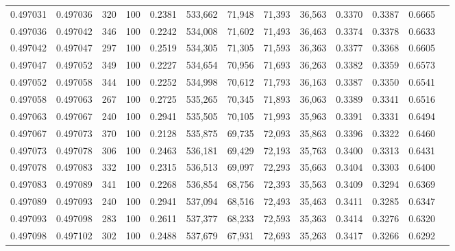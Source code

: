 \begin{tabular}{rrrrrrrrrrrrr}
0.497031 & 0.497036 &   320 & 100 &                                     0.2381 & 533,662 &  71,948 &  71,393 &  36,563 & 0.3370 & 0.3387 & 0.6665 \\
0.497036 & 0.497042 &   346 & 100 &                                     0.2242 & 534,008 &  71,602 &  71,493 &  36,463 & 0.3374 & 0.3378 & 0.6633 \\
0.497042 & 0.497047 &   297 & 100 &                                     0.2519 & 534,305 &  71,305 &  71,593 &  36,363 & 0.3377 & 0.3368 & 0.6605 \\
0.497047 & 0.497052 &   349 & 100 &                                     0.2227 & 534,654 &  70,956 &  71,693 &  36,263 & 0.3382 & 0.3359 & 0.6573 \\
0.497052 & 0.497058 &   344 & 100 &                                     0.2252 & 534,998 &  70,612 &  71,793 &  36,163 & 0.3387 & 0.3350 & 0.6541 \\
0.497058 & 0.497063 &   267 & 100 &                                     0.2725 & 535,265 &  70,345 &  71,893 &  36,063 & 0.3389 & 0.3341 & 0.6516 \\
0.497063 & 0.497067 &   240 & 100 &                                     0.2941 & 535,505 &  70,105 &  71,993 &  35,963 & 0.3391 & 0.3331 & 0.6494 \\
0.497067 & 0.497073 &   370 & 100 &                                     0.2128 & 535,875 &  69,735 &  72,093 &  35,863 & 0.3396 & 0.3322 & 0.6460 \\
0.497073 & 0.497078 &   306 & 100 &                                     0.2463 & 536,181 &  69,429 &  72,193 &  35,763 & 0.3400 & 0.3313 & 0.6431 \\
0.497078 & 0.497083 &   332 & 100 &                                     0.2315 & 536,513 &  69,097 &  72,293 &  35,663 & 0.3404 & 0.3303 & 0.6400 \\
0.497083 & 0.497089 &   341 & 100 &                                     0.2268 & 536,854 &  68,756 &  72,393 &  35,563 & 0.3409 & 0.3294 & 0.6369 \\
0.497089 & 0.497093 &   240 & 100 &                                     0.2941 & 537,094 &  68,516 &  72,493 &  35,463 & 0.3411 & 0.3285 & 0.6347 \\
0.497093 & 0.497098 &   283 & 100 &                                     0.2611 & 537,377 &  68,233 &  72,593 &  35,363 & 0.3414 & 0.3276 & 0.6320 \\
0.497098 & 0.497102 &   302 & 100 &                                     0.2488 & 537,679 &  67,931 &  72,693 &  35,263 & 0.3417 & 0.3266 & 0.6292 \\

\end{tabular}
